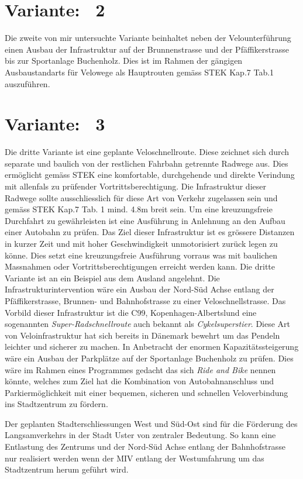 \section{Variante: \ 2}
\label{chap:V2}
	
Die zweite von mir untersuchte Variante beinhaltet neben der Velounterführung einen Ausbau der Infrastruktur auf der Brunnenstrasse und der Pfäffikerstrasse bis zur Sportanlage Buchenholz. Dies ist im Rahmen der gängigen Ausbaustandarts für Velowege als Hauptrouten gemäss STEK Kap.7 Tab.1 auszuführen.

\section{Variante: \ 3}
\label{chap:V3}

Die dritte Variante ist eine geplante Veloschnellroute. 
Diese zeichnet sich durch separate und baulich von der restlichen Fahrbahn getrennte Radwege aus. Dies ermöglicht gemäss STEK eine komfortable, durchgehende und direkte Verindung mit allenfals zu prüfender Vortrittsberechtigung. Die Infrastruktur dieser Radwege sollte ausschliesslich für diese Art von Verkehr zugelassen sein und gemäss STEK Kap.7 Tab. 1 mind. 4.8m breit sein. Um eine kreuzungsfreie Durchfahrt zu gewährleisten ist eine Ausführung in Anlehnung an den Aufbau einer Autobahn zu prüfen.  
Das Ziel dieser Infrastruktur ist es grössere Distanzen in kurzer Zeit und mit hoher Geschwindigkeit unmotorisiert zurück legen zu könne. Dies setzt eine kreuzungsfreie Ausführung vorraus was mit baulichen Massnahmen oder Vortrittsberechtigungen erreicht werden kann.
Die dritte Variante ist an ein Beispiel aus dem Ausland angelehnt. Die Infrastrukturintervention wäre ein Ausbau der Nord-Süd Achse entlang der Pfäffikerstrasse, Brunnen- und Bahnhofstrasse zu einer Veloschnellstrasse. 
Das Vorbild dieser Infrastruktur ist die C99, Kopenhagen-Albertslund eine sogenannten \textit{Super-Radschnellroute} auch bekannt als \textit{Cykelsuperstier}. Diese Art von Veloinfrastruktur hat sich bereits in Dänemark bewehrt um das Pendeln leichter und sicherer zu machen. 
In Anbetracht der enormen Kapazitätssteigerung wäre ein Ausbau der Parkplätze auf der Sportanlage Buchenholz zu prüfen. Dies wäre im Rahmen eines Programmes gedacht das sich \textit{Ride and Bike} nennen könnte, welches zum Ziel hat die Kombination von Autobahnanschluss und Parkiermöglichkeit mit einer bequemen, sicheren und schnellen Veloverbindung ins Stadtzentrum zu fördern. 

Der geplanten Stadterschliessungen West und Süd-Ost sind für die Förderung des Langsamverkehrs in der Stadt Uster von zentraler Bedeutung. So kann eine Entlastung des Zentrums und der Nord-Süd Achse entlang der Bahnhofstrasse nur realisiert werden wenn der MIV entlang der Westumfahrung um das Stadtzentrum herum geführt wird. 





%

